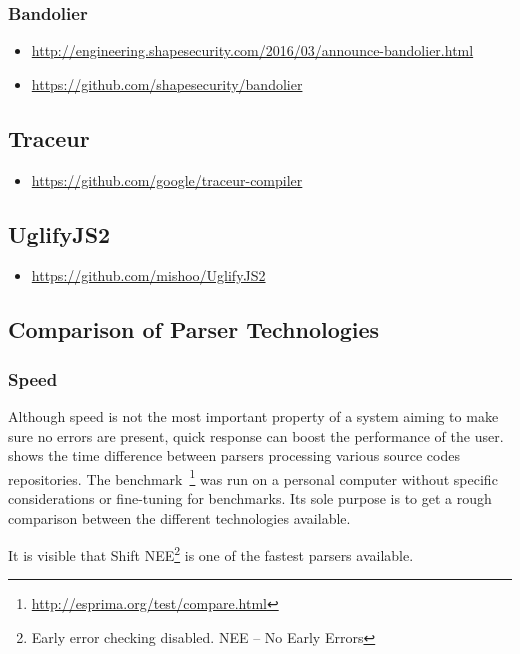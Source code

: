 \subsubsection{Bandolier}
\begin{itemize}
	\item \url{http://engineering.shapesecurity.com/2016/03/announce-bandolier.html}
	\item \url{https://github.com/shapesecurity/bandolier}
\end{itemize}


\subsection{Traceur}
\begin{itemize}
	\item \url{https://github.com/google/traceur-compiler}
\end{itemize}


\subsection{UglifyJS2}
\begin{itemize}
	\item \url{https://github.com/mishoo/UglifyJS2}
\end{itemize}

\subsection{Comparison of Parser Technologies}
\subsubsection{Speed} Although speed is not the most important property of a system aiming to make sure no errors are present, quick response can boost the performance of the user.  shows the time difference between parsers processing various source codes repositories. The benchmark~\footnote{\url{http://esprima.org/test/compare.html}} was run on a personal computer without specific considerations or fine-tuning for benchmarks. Its sole purpose is to get a rough comparison between the different technologies available.

It is visible that Shift NEE\footnote{Early error checking disabled. NEE -- No Early Errors} is one of the fastest parsers available.

